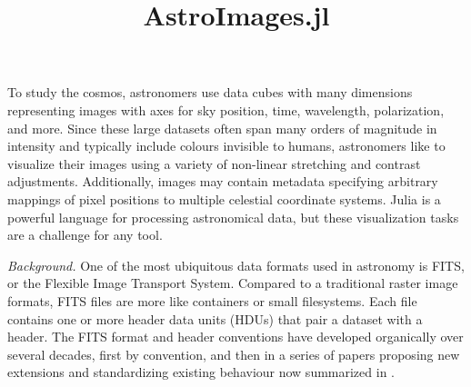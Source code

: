 \documentclass{juliacon}
\begin{document}




\title{AstroImages.jl}

\maketitle





To study the cosmos, astronomers use data cubes with many dimensions representing images with axes for sky position, time, wavelength, polarization, and more. Since these large datasets often span many orders of magnitude in intensity and typically include colours invisible to humans, astronomers like to visualize their images using a variety of non-linear stretching and contrast adjustments.
Additionally, images may contain metadata specifying arbitrary mappings of pixel positions to multiple celestial coordinate systems.
Julia\cite{bezanson2017julia} is a powerful language for processing astronomical data, but these visualization tasks are a challenge for any tool.

\vspace{0.2cm}
\emph{Background.}
One of the most ubiquitous data formats used in astronomy is FITS, or the Flexible Image Transport System.
Compared to a traditional raster image formats, FITS files are more like containers or small filesystems.
Each file contains one or more header data units (HDUs) that pair a dataset with a header.
The FITS format and header conventions have developed organically over several decades, first by convention,
and then in a series of papers proposing new extensions and standardizing existing behaviour now summarized in \cite{fitsstandard}.
\end{document}
